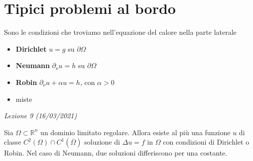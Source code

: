 \documentclass[10pt,a4paper,twoside,openright]{book}
\begin{document}
\section{Tipici problemi al bordo}

Sono le condizioni che troviamo nell'equazione del calore nella parte laterale
\begin{itemize}
\item \textbf{Dirichlet} $u=g$ su $\partial \Omega $
\item \textbf{Neumann} $\partial _{\nu } u=h$ su $\partial \Omega $
\item \textbf{Robin} $\partial _{\nu } u+\alpha u=h$, con $\alpha  >0$
\item miste
\end{itemize}
\textit{Lezione 9 (16/03/2021)}

\begin{theorem}
	Sia $\displaystyle \Omega \subset \mathbb{R}^{n}$ un dominio limitato regolare. Allora esiste al più una funzione $\displaystyle u$ di classe $\displaystyle C^{2}(\Omega) \cap C^{1}(\overline{\Omega })$ soluzione di $\displaystyle \Delta u=f$ in $\displaystyle \Omega $ con condizioni di Dirichlet o Robin. Nel caso di Neumann, due soluzioni differiscono per una costante.
\end{theorem}
\end{document}
